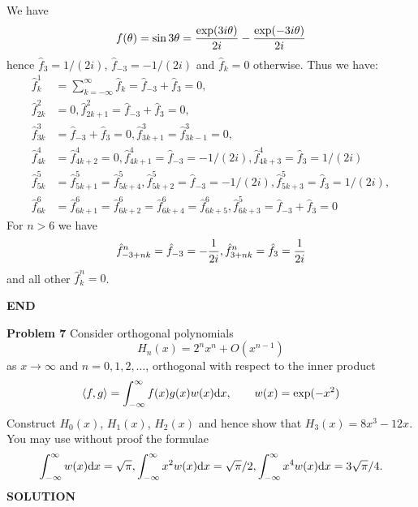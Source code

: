 \documentclass[12pt,a4paper]{article}
\begin{document}
We have
\[
f(\ensuremath{\theta}) = \sin 3 \ensuremath{\theta} = { \exp(3 i \ensuremath{\theta}) \over 2 i} -  { \exp(-3 i \ensuremath{\theta}) \over 2 i}
\]
hence $\hat f_3 = 1/(2i)$, $\hat f_{-3} = -1/(2i)$ and $\hat f_k = 0$ otherwise. Thus we have:
\begin{align*}
\hat f_k^1 &= \sum_{k=-\ensuremath{\infty}}^\ensuremath{\infty} \hat f_k = \hat f_{-3} + \hat f_3 = 0, \\
\hat f_{2k}^2 &= 0, \hat f_{2k+1}^2 = \hat f_{-3} + \hat f_3 = 0, \\
\hat f_{3k}^3 &= \hat f_{-3} + \hat f_3 = 0, \hat f_{3k+1}^3 = \hat f_{3k-1}^3 = 0, \\
\hat f_{4k}^4 &= \hat f_{4k+2}^4 = 0, \hat f_{4k+1}^4 = \hat f_{-3} = -1/(2i), \hat f_{4k+3}^4 = \hat f_{3} = 1/(2i) \\
\hat f_{5k}^5 &= \hat f_{5k+1}^5 = \hat f_{5k+4}^5,  \hat f_{5k+2}^5 = \hat f_{-3} = -1/(2i),  \hat f_{5k+3}^5 = \hat f_{3} = 1/(2i), \\
\hat f_{6k}^6 &= \hat f_{6k+1}^6 = \hat f_{6k+2}^6 = \hat f_{6k+4}^6 = \hat f_{6k+5}^6,  \hat f_{6k+3}^5 = \hat f_{-3} + \hat f_{3} = 0
\end{align*}
For $n > 6$ we have
\[
\hat f_{-3+nk}^n =  \hat f_{-3} = -{1 \over 2i},\hat f_{3+nk}^n =  \hat f_{3} = {1 \over 2i}
\]
and all other $\hat f_k^n = 0$.

\textbf{END}

\textbf{Problem 7} Consider orthogonal polynomials
\[
H_n(x) = 2^n x^n + O (x^{n-1})
\]
as $x \ensuremath{\rightarrow} \ensuremath{\infty}$ and $n = 0, 1, 2, \ensuremath{\ldots}$,  orthogonal with respect to the inner product
\[
\langle f, g \rangle = \int_{-\ensuremath{\infty}}^\ensuremath{\infty} f(x) g(x) w(x) {\rm d}x, \qquad w(x) = \exp(-x^2)
\]
Construct $H_0(x)$, $H_1(x)$, $H_2(x)$ and hence show that $H_3(x) = 8x^3-12x$. You may use without proof the formulae
\[
\int_{-\ensuremath{\infty}}^\ensuremath{\infty} w(x) {\rm d}x = \sqrt{\ensuremath{\pi}}, \int_{-\ensuremath{\infty}}^\ensuremath{\infty} x^2 w(x) {\rm d}x = \sqrt{\ensuremath{\pi}}/2,
\int_{-\ensuremath{\infty}}^\ensuremath{\infty} x^4 w(x) {\rm d}x = 3\sqrt{\ensuremath{\pi}}/4.
\]
\textbf{SOLUTION}
\end{document}
